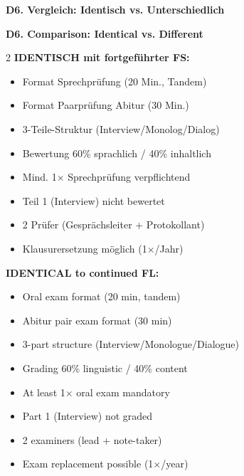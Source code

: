 \documentclass[10pt,a4paper]{article}
\newcommand{\secbil}[2]{%
\vspace{6pt}
\noindent\colorbox{spaet}{\parbox{0.48\textwidth}{\color{white}\bfseries\small #1}}%
\hfill%
\colorbox{english}{\parbox{0.48\textwidth}{\color{white}\bfseries\small #2}}
\vspace{3pt}
}
\begin{document}
\vspace{4mm}

\secbil{D6. Vergleich: Identisch vs. Unterschiedlich}{D6. Comparison: Identical vs. Different}

\vspace{2mm}

\begin{paracol}{2}
\small
\textbf{IDENTISCH mit fortgeführter FS:}\footnotemark[14]
\begin{itemize}[noitemsep,topsep=2pt]
\item Format Sprechprüfung (20 Min., Tandem)
\item Format Paarprüfung Abitur (30 Min.)
\item 3-Teile-Struktur (Interview/Monolog/Dialog)
\item Bewertung 60\% sprachlich / 40\% inhaltlich
\item Mind. 1$\times$ Sprechprüfung verpflichtend
\item Teil 1 (Interview) nicht bewertet
\item 2 Prüfer (Gesprächsleiter + Protokollant)
\item Klausurersetzung möglich (1$\times$/Jahr)
\end{itemize}

\switchcolumn

\small\color{english}
\textbf{IDENTICAL to continued FL:}\footnotemark[14]
\begin{itemize}[noitemsep,topsep=2pt]
\item Oral exam format (20 min, tandem)
\item Abitur pair exam format (30 min)
\item 3-part structure (Interview/Monologue/Dialogue)
\item Grading 60\% linguistic / 40\% content
\item At least 1$\times$ oral exam mandatory
\item Part 1 (Interview) not graded
\item 2 examiners (lead + note-taker)
\item Exam replacement possible (1$\times$/year)
\end{itemize}

\end{paracol}

\vspace{2mm}
\end{document}
